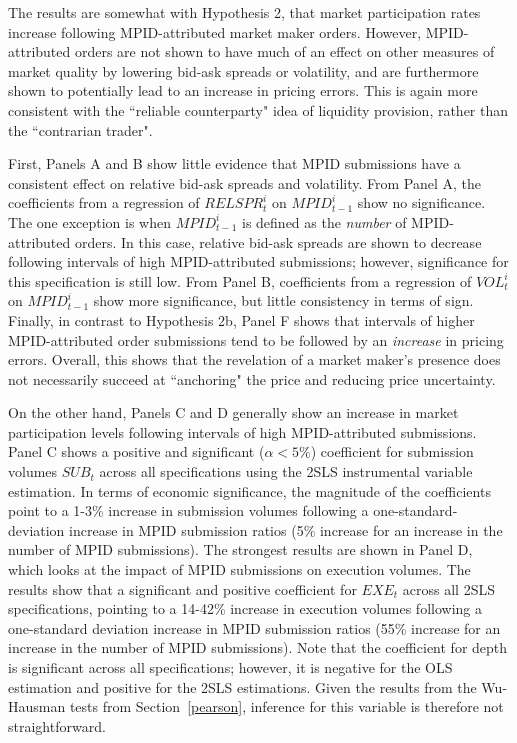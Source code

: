 \documentclass{article}
\begin{document}
The results are somewhat with Hypothesis 2, that market participation rates increase following MPID-attributed market maker orders. However, MPID-attributed orders are not shown to have much of an effect on other measures of market quality by lowering bid-ask spreads or volatility, and are furthermore shown to potentially lead to an increase in pricing errors. This is again more consistent with the ``reliable counterparty" idea of liquidity provision, rather than the ``contrarian trader".

First, Panels A and B show little evidence that MPID submissions have a consistent effect on relative bid-ask spreads and volatility. From Panel A, the coefficients from a regression of $RELSPR_t^i$ on $MPID_{t-1}^i$ show no significance. The one exception is when $MPID_{t-1}^i$ is defined as the \emph{number} of MPID-attributed orders. In this case, relative bid-ask spreads are shown to decrease following intervals of high MPID-attributed submissions; however, significance for this specification is still low. From Panel B, coefficients from a regression of $VOL_t^i$ on $MPID_{t-1}^i$ show more significance, but little consistency in terms of sign. Finally, in contrast to Hypothesis 2b, Panel F shows that intervals of higher MPID-attributed order submissions tend to be followed by an \emph{increase} in pricing errors. Overall, this shows that the revelation of a market maker's presence does not necessarily succeed at ``anchoring" the price and reducing price uncertainty.

On the other hand, Panels C and D generally show an increase in market participation levels following intervals of high MPID-attributed submissions. Panel C shows a positive and significant ($\alpha < 5\%$) coefficient for submission volumes $SUB_t$ across all specifications using the 2SLS instrumental variable estimation. In terms of economic significance, the magnitude of the coefficients point to a 1-3\% increase in submission volumes following a one-standard-deviation increase in MPID submission ratios (5\% increase for an increase in the number of MPID submissions). The strongest results are shown in Panel D, which looks at the impact of MPID submissions on execution volumes. The results show that a significant and positive coefficient for $EXE_t$ across all 2SLS specifications, pointing to a 14-42\% increase in execution volumes following a one-standard deviation increase in MPID submission ratios (55\% increase for an increase in the number of MPID submissions). Note that the coefficient for depth is significant across all specifications; however, it is negative for the OLS estimation and positive for the 2SLS estimations. Given the results from the Wu-Hausman tests from Section~\ref{pearson}, inference for this variable is therefore not straightforward.
\end{document}

